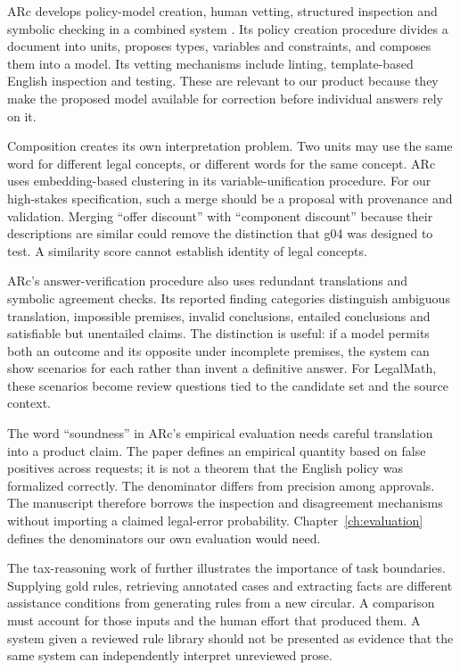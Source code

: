 ARc develops policy-model creation, human vetting, structured inspection and
symbolic checking in a combined system \citep[sec.~3 and appendix A]{arc2025}.
Its policy creation procedure divides a document into units, proposes types,
variables and constraints, and composes them into a model. Its vetting
mechanisms include linting, template-based English inspection and testing.
These are relevant to our product because they make the proposed model
available for correction before individual answers rely on it.


Composition creates its own interpretation problem. Two units may use the same
word for different legal concepts, or different words for the same concept.
ARc uses embedding-based clustering in its variable-unification procedure.
For our high-stakes specification, such a merge should be a proposal with
provenance and validation. Merging ``offer discount'' with ``component
discount'' because their descriptions are similar could remove the distinction
that g04 was designed to test. A similarity score cannot establish identity
of legal concepts.

ARc's answer-verification procedure also uses redundant translations and
symbolic agreement checks. Its reported finding categories distinguish
ambiguous translation, impossible premises, invalid conclusions, entailed
conclusions and satisfiable but unentailed claims. The distinction is useful:
if a model permits both an outcome and its opposite under incomplete premises,
the system can show scenarios for each rather than invent a definitive answer.
For LegalMath, these scenarios become review questions tied to the candidate
set and the source context.

The word ``soundness'' in ARc's empirical evaluation needs careful translation
into a product claim. The paper defines an empirical quantity based on false
positives across requests; it is not a theorem that the English policy was
formalized correctly. The denominator differs from precision among approvals.
The manuscript therefore borrows the inspection and disagreement mechanisms
without importing a claimed legal-error probability. Chapter~\ref{ch:evaluation}
defines the denominators our own evaluation would need.

The tax-reasoning work of \citet{jurayj2026} further illustrates the importance
of task boundaries. Supplying gold rules, retrieving annotated cases and
extracting facts are different assistance conditions from generating rules
from a new circular. A comparison must account for those inputs and the human
effort that produced them. A system given a reviewed rule library should not
be presented as evidence that the same system can independently interpret
unreviewed prose.

